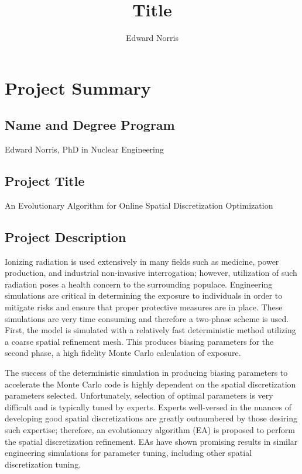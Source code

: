 \documentclass{article}
\begin{document}
\title{Title}
\author{Edward Norris}




\section{Project Summary}\label{sec:A}
\subsection{Name and Degree Program}\label{sec:a1}
Edward Norris, PhD in Nuclear Engineering

\subsection{Project Title}\label{sec:a2}
An Evolutionary Algorithm for Online Spatial Discretization Optimization

\subsection{Project Description}\label{sec:a3}
Ionizing radiation is used extensively in many fields such as medicine, power production, and industrial non-invasive interrogation; however, utilization of such radiation poses a health concern to the surrounding populace. Engineering simulations are critical in determining the exposure to individuals in order to mitigate risks and ensure that proper protective measures are in place. These simulations are very time consuming and therefore a two-phase scheme is used. First, the model is simulated with a relatively fast deterministic method utilizing a coarse spatial refinement mesh. This produces biasing parameters for the second phase, a high fidelity Monte Carlo calculation of exposure.

The success of the deterministic simulation in producing biasing parameters to accelerate the Monte Carlo code is highly dependent on the spatial discretization parameters selected. Unfortunately, selection of optimal parameters is very difficult and is typically tuned by experts. Experts well-versed in the nuances of developing good spatial discretizations are greatly outnumbered by those desiring such expertise; therefore, an evolutionary algorithm (EA) is proposed to perform the spatial discretization refinement. EAs have shown promising results in similar engineering simulations for parameter tuning, including other spatial discretization tuning.
\end{document}
